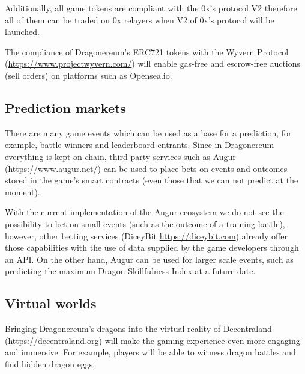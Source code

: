\documentclass[12pt]{article}
\begin{document}
Additionally, all game tokens are compliant with the 0x’s protocol V2 therefore all of them can be traded on 0x relayers when V2 of 0x’s protocol will be launched.\par

The compliance of Dragonereum’s ERC721 tokens with the Wyvern Protocol (\url{https://www.projectwyvern.com/}) will enable gas-free and escrow-free auctions (sell orders) on platforms such as Opensea.io.\par


\vspace{\baselineskip}
\subsection{Prediction markets}\label{Prediction markets}\par

There are many game events which can be used as a base for a prediction, for example, battle winners and leaderboard entrants. Since in Dragonereum everything is kept on-chain, third-party services such as Augur (\url{https://www.augur.net/}) can be used to place bets on events and outcomes stored in the game’s smart contracts (even those that we can not predict at the moment).\par

With the current implementation of the Augur ecosystem we do not see the possibility to bet on small events (such as the outcome of a training battle), however, other betting services (DiceyBit \url{https://diceybit.com}) already offer those capabilities with the use of data supplied by the game developers through an API. On the other hand, Augur can be used for larger scale events, such as predicting the maximum Dragon Skillfulness Index at a future date.\par


\vspace{\baselineskip}
 \subsection{Virtual worlds}\label{Virtual worlds} \par

Bringing Dragonereum’s dragons into the virtual reality of Decentraland (\url{https://decentraland.org}) will make the gaming experience even more engaging and immersive. For example, players will be able to witness dragon battles and find hidden dragon eggs. \par
\end{document}
